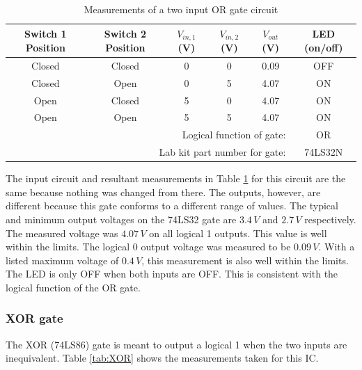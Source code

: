 \documentclass[CMPE]{KGCOEReport}
\begin{document}
\begin{table}[h]
\renewcommand{\arraystretch}{1.2}
\caption{Measurements of a two input OR gate circuit}
\begin{center}
\begin{tabular}{|c|c|c|c|c|c|}
\hline
Switch 1 Position & Switch 2 Position & $V_{in,1}$ (V) & $V_{in,2}$ (V) & $V_{out}$ (V) & LED (on/off)\\\hline

Closed & Closed & 0 & 0 & 0.09  & OFF \\\hline
Closed & Open   & 0 & 5 & 4.07  & ON \\\hline
Open   & Closed & 5 & 0 & 4.07  & ON \\\hline
Open   & Open   & 5 & 5 & 4.07 & ON \\\hline
\multicolumn{5}{|r|}{Logical function of gate: } & OR  \\\hline
\multicolumn{5}{|r|}{Lab kit part number for gate: } & 74LS32N  \\\hline

\end{tabular}
\end{center}
\label{tab:OR}
\end{table}

The input circuit and resultant measurements in Table \ref{tab:OR} for this circuit are the same because nothing was changed from there. The outputs, however, are different because this gate conforms to a different range of values. The typical and minimum output voltages on the 74LS32 gate are $3.4\,V$ and $2.7\,V$ respectively. The measured voltage was $4.07\,V$ on all logical 1 outputs. This value is well within the limits. The logical 0 output voltage was measured to be $0.09\,V$. With a listed maximum voltage of $0.4\,V$, this measurement is also well within the limits. The LED is only OFF when both inputs are OFF. This is consistent with the logical function of the OR gate.

\subsubsection{XOR gate}
The XOR (74LS86) gate is meant to output a logical 1 when the two inputs are inequivalent. Table \ref{tab:XOR} shows the measurements taken for this IC.
\end{document}

